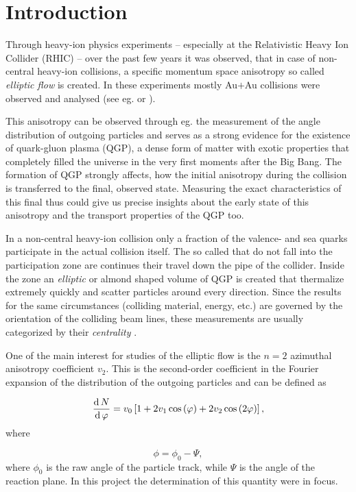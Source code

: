 \section{Introduction} \label{sec:1}
Through heavy-ion physics experiments -- especially at the Relativistic Heavy Ion Collider (RHIC) -- over the past few years it was observed, that in case of non-central heavy-ion collisions, a specific momentum space anisotropy so called \emph{elliptic flow} is created. In these experiments mostly Au$+$Au collisions were observed and analysed (see eg. \cite{Lin2002} or \cite{Collaboration2009}).

This anisotropy can be observed through eg. the measurement of the angle distribution of outgoing particles and serves as a strong evidence for the existence of quark-gluon plasma (QGP), a dense form of matter with exotic properties that completely filled the universe in the very first moments after the Big Bang. The formation of QGP strongly affects, how the initial anisotropy during the collision is transferred to the final, observed state. Measuring the exact characteristics of this final  thus could give us precise insights about the early state of this anisotropy and the transport properties of the QGP too.

In a non-central heavy-ion collision only a fraction of the valence- and sea quarks participate in the actual collision itself. The so called  that do not fall into the participation zone are continues their travel down the pipe of the collider. Inside the zone an \emph{elliptic} or almond shaped volume of QGP is created that thermalize extremely quickly and scatter particles around every direction. Since the results for the same circumstances (colliding material, energy, etc.) are governed by the orientation of the colliding beam lines, these measurements are usually categorized by their \emph{centrality} \citep{Snellings2011}.

One of the main interest for studies of the elliptic flow is the $n=2$ azimuthal anisotropy coefficient $v_{2}$. This is the second-order coefficient in the Fourier expansion of the distribution of the outgoing particles and can be defined as

\begin{equation} \label{eq:1.1}
	\frac{\operatorname{d}{N}}{\operatorname{d}{\varphi}}
	=
	v_{0}
	\left[
		1
		+
		2 v_{1} \cos \left( \varphi \right)
		+		
		2 v_{2} \cos \left( 2 \varphi \right)
	\right],
\end{equation}
where

\begin{equation} \label{eq:1.2}
	\phi = \phi_{0} - \Psi,
\end{equation}
where $\phi_{0}$ is the raw angle of the particle track, while $\Psi$ is the angle of the reaction plane. In this project the determination of this quantity were in focus.